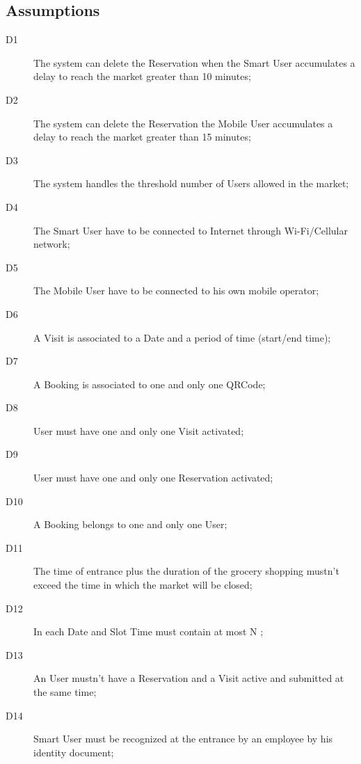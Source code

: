 \subsection{Assumptions}
\begin{description}
    \item[D1] The system can delete the Reservation when the Smart User accumulates a delay to reach the market greater than 10 minutes; 
    \item[D2] The system can delete the Reservation the Mobile User accumulates a delay to reach the market greater than 15 minutes; 
    \item[D3] The system handles the threshold number of Users allowed in the market;
    \item[D4] The Smart User have to be connected to Internet through Wi-Fi/Cellular network;
    \item[D5] The Mobile User have to be connected to his own mobile operator;
    \item[D6] A Visit is associated to a Date and a period of time (start/end time);
    \item[D7] A Booking is associated to one and only one QRCode;
    \item[D8] User must have one and only one Visit activated;
    \item[D9] User must have one and only one Reservation activated;
    \item[D10] A Booking belongs to one and only one User;
    \item[D11] The time  of entrance plus the duration of the grocery shopping mustn’t exceed the time in which the market will be closed; 
    \item[D12] In each Date and Slot Time must contain at most N ;
    \item[D13] An User mustn’t have a Reservation and a Visit active and submitted at the same time;
    \item[D14] Smart User must be recognized at the entrance by an employee by his identity document;   
\end{description}

